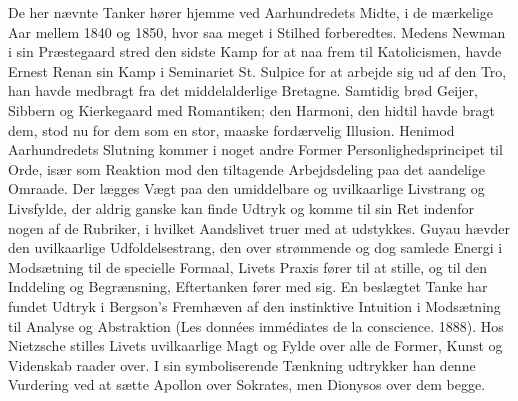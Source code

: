 \documentclass[12pt,a4paper,openany]{book}
\newcommand{\opage}[1]{\marginnote{\footnotesize\textit{[#1]}}}
\begin{document}
De her nævnte Tanker hører hjemme ved Aarhundredets Midte,
i de mærkelige Aar mellem 1840 og 1850, hvor saa meget i Stilhed
forberedtes. Medens Newman i sin Præstegaard stred den sidste
Kamp for at naa frem til Katolicismen, havde Ernest Renan sin
Kamp i Seminariet St. Sulpice for at arbejde sig ud af den Tro, han
havde medbragt fra det middelalderlige Bretagne. Samtidig brød
Geijer, Sibbern og Kierkegaard med Romantiken; den Harmoni, den
hidtil havde bragt dem, stod nu for dem som en stor, maaske fordærvelig
Illusion. Henimod Aarhundredets Slutning kommer i noget
andre Former Personlighedsprincipet til Orde, især som Reaktion
mod den tiltagende Arbejdsdeling paa det aandelige Omraade. Der
lægges Vægt paa den umiddelbare og uvilkaarlige Livstrang og Livsfylde,
der aldrig ganske kan finde Udtryk og komme til sin Ret indenfor
nogen af de Rubriker, i hvilket Aandslivet truer med at udstykkes.
Guyau hævder den uvilkaarlige Udfoldelsestrang, den over%
\opage{141}strømmende og dog samlede Energi i Modsætning til de specielle
Formaal, Livets Praxis fører til at stille, og til den Inddeling og Begrænsning,
Eftertanken fører med sig. En beslægtet Tanke har fundet
Udtryk i Bergson’s Fremhæven af den instinktive Intuition i
Modsætning til Analyse og Abstraktion (Les données immédiates de
la conscience. 1888). Hos Nietzsche stilles Livets uvilkaarlige Magt
og Fylde over alle de Former, Kunst og Videnskab raader over. I sin
symboliserende Tænkning udtrykker han denne Vurdering ved at
sætte Apollon over Sokrates, men Dionysos over dem begge.
\end{document}
